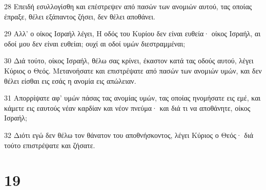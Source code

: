 \par 28 Επειδή εσυλλογίσθη και επέστρεψεν από πασών των ανομιών αυτού, τας οποίας έπραξε, θέλει εξάπαντος ζήσει, δεν θέλει αποθάνει.
\par 29 Αλλ' ο οίκος Ισραήλ λέγει, Η οδός του Κυρίου δεν είναι ευθεία· οίκος Ισραήλ, αι οδοί μου δεν είναι ευθείαι; ουχί αι οδοί υμών διεστραμμέναι;
\par 30 Διά τούτο, οίκος Ισραήλ, θέλω σας κρίνει, έκαστον κατά τας οδούς αυτού, λέγει Κύριος ο Θεός. Μετανοήσατε και επιστρέψατε από πασών των ανομιών υμών, και δεν θέλει είσθαι εις εσάς η ανομία εις απώλειαν.
\par 31 Απορρίψατε αφ' υμών πάσας τας ανομίας υμών, τας οποίας ηνομήσατε εις εμέ, και κάμετε εις εαυτούς νέαν καρδίαν και νέον πνεύμα· και διά τι να αποθάνητε, οίκος Ισραήλ;
\par 32 Διότι εγώ δεν θέλω τον θάνατον του αποθνήσκοντος, λέγει Κύριος ο Θεός· διά τούτο επιστρέψατε και ζήσατε.

\chapter{19}

